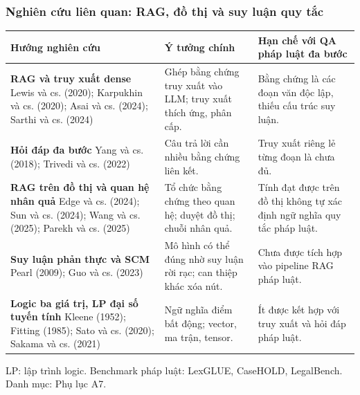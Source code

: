 \begin{frame}
\frametitle{Nghiên cứu liên quan: RAG, đồ thị và suy luận quy tắc}
\vspace{-0.05cm}
{\scriptsize
\setlength{\tabcolsep}{3pt}
\renewcommand{\arraystretch}{1.0}
\begin{tabular}{@{}>{\raggedright\arraybackslash}p{}
                >{\raggedright\arraybackslash}p{}
                >{\raggedright\arraybackslash}p{}@{}}
\toprule
\textbf{Hướng nghiên cứu} & \textbf{Ý tưởng chính} & \textbf{Hạn chế với QA pháp luật đa bước}\\
\midrule
\textbf{RAG và truy xuất dense}\newline
{\color{schemaGray}Lewis và cs. (2020); Karpukhin và cs. (2020); Asai và cs. (2024); Sarthi và cs. (2024)}
& Ghép bằng chứng truy xuất vào LLM; truy xuất thích ứng, phân cấp.
& Bằng chứng là các đoạn văn độc lập, thiếu cấu trúc suy luận.\\
\addlinespace[1pt]
\textbf{Hỏi đáp đa bước}\newline
{\color{schemaGray}Yang và cs. (2018); Trivedi và cs. (2022)}
& Câu trả lời cần nhiều bằng chứng liên kết.
& Truy xuất riêng lẻ từng đoạn là chưa đủ.\\
\addlinespace[1pt]
\textbf{RAG trên đồ thị và quan hệ nhân quả}\newline
{\color{schemaGray}Edge và cs. (2024); Sun và cs. (2024); Wang và cs. (2025); Parekh và cs. (2025)}
& Tổ chức bằng chứng theo quan hệ; duyệt đồ thị; chuỗi nhân quả.
& Tính đạt được trên đồ thị không tự xác định ngữ nghĩa quy tắc pháp luật.\\
\addlinespace[1pt]
\textbf{Suy luận phản thực và SCM}\newline
{\color{schemaGray}Pearl (2009); Guo và cs. (2023)}
& Mô hình có thể đúng nhờ suy luận rời rạc; can thiệp khác xóa nút.
& Chưa được tích hợp vào pipeline RAG pháp luật.\\
\addlinespace[1pt]
\textbf{Logic ba giá trị, LP đại số tuyến tính}\newline
{\color{schemaGray}Kleene (1952); Fitting (1985); Sato và cs. (2020); Sakama và cs. (2021)}
& Ngữ nghĩa điểm bất động; vector, ma trận, tensor.
& Ít được kết hợp với truy xuất và hỏi đáp pháp luật.\\
\bottomrule
\end{tabular}}

\vspace{0.05cm}
{\scriptsize\color{schemaGray} LP: lập trình logic. Benchmark pháp luật: LexGLUE, CaseHOLD, LegalBench. Danh mục: Phụ lục A7.}
\end{frame}

